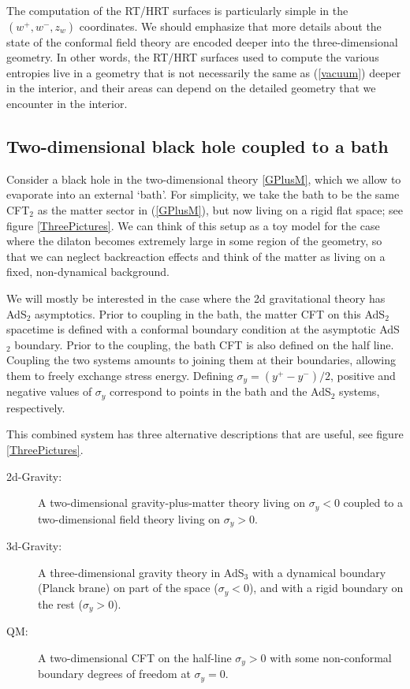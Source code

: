 \documentclass[12pt]{article}
\def\nref#1{(\ref{#1})}
\begin{document}
The computation of the RT/HRT surfaces is particularly simple in the $(w^+,w^-,z_w)$ coordinates.
We should emphasize that more details about the state of the conformal field theory are encoded deeper into the three-dimensional geometry.
In other words, the RT/HRT surfaces used to compute the various entropies live in a geometry that is not necessarily the same as \nref{vacuum} deeper in the interior, and their areas can depend on the detailed geometry that we  encounter in the interior.

\subsection{Two-dimensional black hole coupled to a bath}

Consider a black hole in the two-dimensional theory \eqref{GPlusM}, which we allow to evaporate into an external `bath'.
For simplicity, we take the bath to be the same CFT$_2$ as the matter sector in (\ref{GPlusM}), but now living on a rigid flat space; see figure \ref{ThreePictures}.
We can think of this setup as a toy model for the case where the dilaton becomes extremely large in some region of the geometry, so that we can neglect backreaction effects and think of the matter as living on a fixed, non-dynamical background. 

We will mostly be interested in the case where the 2d gravitational theory has AdS$_2$ asymptotics.
Prior to coupling in the bath, the matter CFT on this AdS$_2$ spacetime is defined with a conformal boundary condition at the asymptotic AdS$_2$ boundary. 
Prior to the coupling, the bath CFT is also defined on the half line. 
Coupling the two systems amounts to joining them at their boundaries, allowing them to freely exchange stress energy. 
Defining $\sigma_y = (y^+ - y^-)/2$, positive and negative values of $\sigma_y$ correspond to points in the bath and the AdS$_2$ systems, respectively. 

This combined system has three alternative descriptions that are useful, see figure \ref{ThreePictures}.  
\begin{description}
\item[2d-Gravity:]
A two-dimensional gravity-plus-matter theory living on $\sigma_y<0$ coupled to a two-dimensional field theory living on $\sigma_y>0$.

\item[3d-Gravity:] 
A three-dimensional gravity theory in AdS$_3$ with a dynamical boundary (Planck brane) on part of the space ($\sigma_y<0$), and with a rigid boundary on the rest ($\sigma_y>0$). 

\item[QM:]
A two-dimensional CFT on the half-line $\sigma_y>0$ with some non-conformal boundary degrees of freedom at $\sigma_y = 0$.
\end{description}
\end{document}
